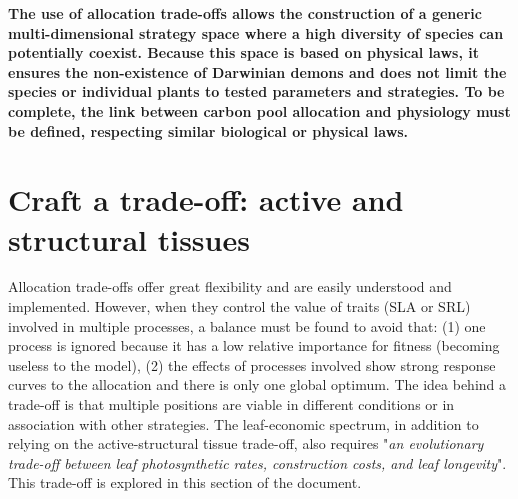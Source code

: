 \textbf{The use of allocation trade-offs allows the construction of a generic multi-dimensional strategy space where a high diversity of species can potentially coexist. Because this space is based on physical laws, it ensures the non-existence of Darwinian demons and does not limit the species or individual plants to tested parameters and strategies. To be complete, the link between carbon pool allocation and physiology must be defined, respecting similar biological or physical laws.}

\section{Craft a trade-off: active and structural tissues}

Allocation trade-offs offer great flexibility and are easily understood and implemented. However, when they control the value of traits (SLA or SRL) involved in multiple processes, a balance must be found to avoid that: (1) one process is ignored because it has a low relative importance for fitness (becoming useless to the model), (2) the effects of processes involved show strong response curves to the allocation and there is only one global optimum. The idea behind a trade-off is that multiple positions are viable in different conditions or in association with other strategies. The leaf-economic spectrum, in addition to relying on the active-structural tissue trade-off, also requires "\textit{an evolutionary trade-off between leaf photosynthetic rates, construction costs, and leaf longevity}"\parencite{shipley_fundamental_2006}. This trade-off is explored in this section of the document.\\


